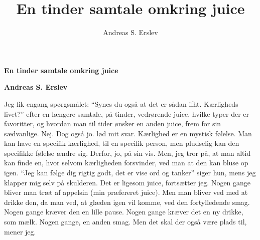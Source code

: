 \documentclass[]{article}
\title{En tinder samtale omkring juice}
\author{Andreas S. Erslev}
\begin{document}
	
	\begin{center}
		\Large\textbf{En tinder samtale omkring juice}
	\end{center}
	
	\begin{center}
		\large\textbf{Andreas S. Erslev}
	\end{center}
	
	Jeg fik engang spørgsmålet: “Synes du også at det er sådan ifht. Kærligheds livet?” efter en længere samtale, på tinder, vedrørende juice, hvilke typer der er favoritter, og hvordan man til tider ønsker en anden juice, frem for sin sædvanlige.
	\newline
	\newline
	Nej. Dog også jo. lød mit svar.
	\newline
	\newline
	Kærlighed er en mystisk følelse.
	\newline
	\newline
	Man kan have en specifik kærlighed, til en specifik person, men pludselig kan den specifikke følelse ændre sig.
	\newline
	\newline
	Derfor, jo, på sin vis.
	\newline
	\newline
	Men, jeg tror på, at man altid kan finde en, hvor selvom
	\newline
	\newline
	kærligheden forsvinder, ved man at den kan bluse op igen.
	\newline
	\newline
	“Jeg kan følge dig rigtig godt, det er vise ord og tanker” siger hun, mens jeg klapper mig selv på skulderen.
	\newline
	\newline
	Det er ligesom juice, fortsætter jeg.
	\newline
	\newline
	Nogen gange bliver man træt af appelsin (min præfereret juice). Men man bliver ved med at drikke den, da man ved, at glæden igen vil komme, ved den fortylledende smag.
	\newline
	\newline
	Nogen gange kræver den en lille pause. Nogen gange kræver det en ny drikke, som mælk. Nogen gange, en anden smag.
	\newline
	\newline
	Men det skal der også være plads til, mener jeg.
	\newline
	\newline
\end{document}
